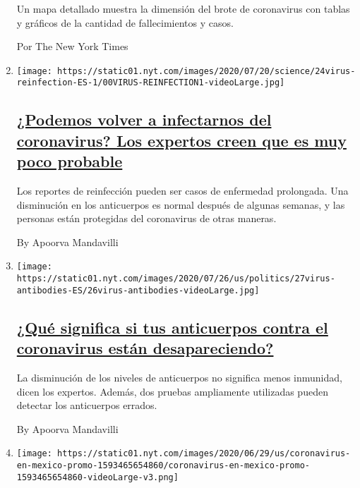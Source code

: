 \begin{enumerate}
  Un mapa detallado muestra la dimensión del brote de coronavirus con
  tablas y gráficos de la cantidad de fallecimientos y casos.

  Por The New York Times
\item
  \texttt{[image: https://static01.nyt.com/images/2020/07/20/science/24virus-reinfection-ES-1/00VIRUS-REINFECTION1-videoLarge.jpg]}

  \hypertarget{podemos-volver-a-infectarnos-del-coronavirus-los-expertos-creen-que-es-muy-poco-probable}{%
  \subsection{\texorpdfstring{\href{/es/2020/07/24/espanol/ciencia-y-tecnologia/reinfeccion-coronavirus.html}{¿Podemos
  volver a infectarnos del coronavirus? Los expertos creen que es muy
  poco
  probable}}{¿Podemos volver a infectarnos del coronavirus? Los expertos creen que es muy poco probable}}\label{podemos-volver-a-infectarnos-del-coronavirus-los-expertos-creen-que-es-muy-poco-probable}}

  Los reportes de reinfección pueden ser casos de enfermedad prolongada.
  Una disminución en los anticuerpos es normal después de algunas
  semanas, y las personas están protegidas del coronavirus de otras
  maneras.

  By Apoorva Mandavilli
\item
  \texttt{[image: https://static01.nyt.com/images/2020/07/26/us/politics/27virus-antibodies-ES/26virus-antibodies-videoLarge.jpg]}

  \hypertarget{quuxe9-significa-si-tus-anticuerpos-contra-el-coronavirus-estuxe1n-desapareciendo}{%
  \subsection{\texorpdfstring{\href{/es/2020/07/28/espanol/ciencia-y-tecnologia/anticuerpos-coronavirus-inmunidad.html}{¿Qué
  significa si tus anticuerpos contra el coronavirus están
  desapareciendo?}}{¿Qué significa si tus anticuerpos contra el coronavirus están desapareciendo?}}\label{quuxe9-significa-si-tus-anticuerpos-contra-el-coronavirus-estuxe1n-desapareciendo}}

  La disminución de los niveles de anticuerpos no significa menos
  inmunidad, dicen los expertos. Además, dos pruebas ampliamente
  utilizadas pueden detectar los anticuerpos errados.

  By Apoorva Mandavilli
\item
  \texttt{[image: https://static01.nyt.com/images/2020/06/29/us/coronavirus-en-mexico-promo-1593465654860/coronavirus-en-mexico-promo-1593465654860-videoLarge-v3.png]}


\end{enumerate}
